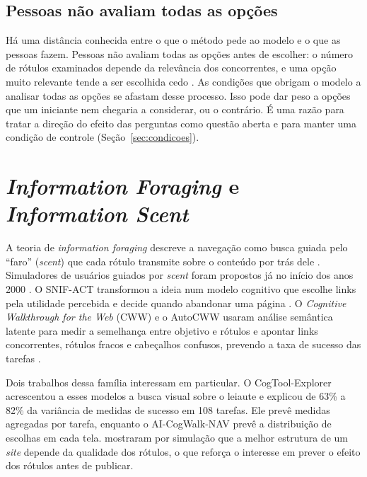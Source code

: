 \documentclass[12pt,oneside,a4paper,chapter=TITLE,english,brazil]{abntex2}
\newcommand{\proj}{AI-CogWalk-NAV}
\begin{document}
\subsection{Pessoas não avaliam todas as opções}

Há uma distância conhecida entre o que o método pede ao modelo e o que as pessoas fazem. Pessoas não avaliam todas as opções antes de escolher: o número de rótulos examinados depende da relevância dos concorrentes, e uma opção muito relevante tende a ser escolhida cedo \cite{brumby2008strategies}. As condições que obrigam o modelo a analisar todas as opções se afastam desse processo. Isso pode dar peso a opções que um iniciante nem chegaria a considerar, ou o contrário. É uma razão para tratar a direção do efeito das perguntas como questão aberta e para manter uma condição de controle (Seção~\ref{sec:condicoes}).

\section{\textit{Information Foraging} e \textit{Information Scent}}
\label{sec:scent}

A teoria de \textit{information foraging} descreve a navegação como busca guiada pelo ``faro'' (\textit{scent}) que cada rótulo transmite sobre o conteúdo por trás dele \cite{pirolli1999foraging}. Simuladores de usuários guiados por \textit{scent} foram propostos já no início dos anos 2000 \cite{chi2001scent,chi2003bloodhound}. O SNIF-ACT transformou a ideia num modelo cognitivo que escolhe links pela utilidade percebida e decide quando abandonar uma página \cite{fu2007snifact}. O \textit{Cognitive Walkthrough for the Web} (CWW) e o AutoCWW usaram análise semântica latente para medir a semelhança entre objetivo e rótulos e apontar links concorrentes, rótulos fracos e cabeçalhos confusos, prevendo a taxa de sucesso das tarefas \cite{blackmon2002cww,blackmon2005autocww}.

Dois trabalhos dessa família interessam em particular. O CogTool-Explorer \cite{teo2012cogtoolexplorer} acrescentou a esses modelos a busca visual sobre o leiaute e explicou de 63\% a 82\% da variância de medidas de sucesso em 108 tarefas. Ele prevê medidas agregadas por tarefa, enquanto o \proj{} prevê a distribuição de escolhas em cada tela.  mostraram por simulação que a melhor estrutura de um \textit{site} depende da qualidade dos rótulos, o que reforça o interesse em prever o efeito dos rótulos antes de publicar.
\end{document}
